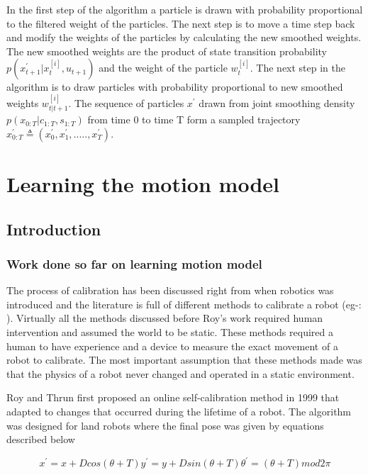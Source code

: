 \documentclass[12pt,draft]{dalcsthesis}
\begin{document}
In the first step of the algorithm a particle is drawn with probability proportional to the filtered weight of the particles. The next step is to move a time step back and modify the weights of the particles by calculating the new smoothed weights. The new smoothed weights are the product of state transition probability $p(x ^{'} _{t+1}|x_{t}^{[i]},u _{t+1})$ and the weight of the particle $w_{t}^{[i]}$. The next step in the algorithm is to draw particles with probability proportional to new smoothed weights $w_{t|t+1}^{[i]}$.  The sequence of particles $x^{'}$ drawn from joint smoothing density $p(x_{0:T}|c_{1:T},s_{1:T})$ from time 0 to time T form a sampled trajectory $x^{'}_{0:T} \triangleq (x^{'}_0,x^{'}_1,.....,x^{'}_T)$.
 
 
 





\chapter{Learning the motion model}
\label{learning the motion model}
\section{Introduction}
\subsection{Work done so far on learning motion model}
The process of calibration has been discussed right from when robotics was introduced and the literature is full of different methods to calibrate a robot (eg-: \cite{cox1990autonomous} \cite{vukobratovic1989introduction}). Virtually all the methods discussed before Roy's work \cite{Roy} required human intervention and assumed the world to be static. These methods required a human to have experience and a device to measure the exact movement of a robot to calibrate. The most important assumption that these methods made was that the physics of a robot never changed and operated in a static environment. 

Roy and Thrun first proposed an online self-calibration method \cite{Roy} in 1999 that adapted to changes that occurred during the lifetime of a robot. The algorithm was designed for land robots where the final pose was given by equations described below

\begin{equation}
x^{'}=x+Dcos(\theta+T)
y^{'}=y+Dsin(\theta+T)
\theta^{'}=(\theta+T)mod2\pi
\end{equation}
\end{document}
